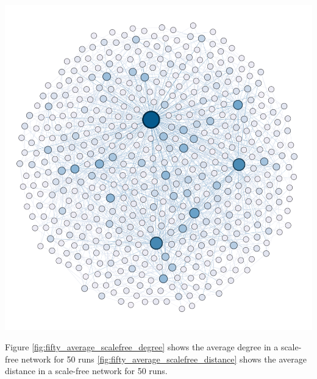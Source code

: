 \documentclass[journal]{IEEEtran}
\begin{document}
\begingroup
    \centering
    \includegraphics[width=\columnwidth]{images/scale-free.png}
    \label{fig:scalefree_network}
\endgroup

\newpage

\noindent Figure \ref{fig:fifty_average_scalefree_degree} shows the average degree in a scale-free network for 50 runs \ref{fig:fifty_average_scalefree_distance} shows the average distance in a scale-free network for 50 runs.
\end{document}

